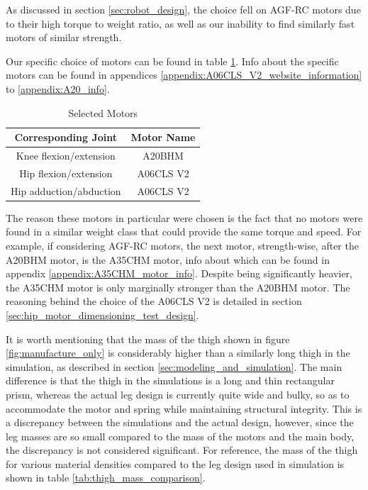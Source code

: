 As discussed in section \ref{sec:robot_design}, the choice fell on AGF-RC motors due to their high torque to weight ratio, as well as our inability to find similarly fast motors of similar strength. 

Our specific choice of motors can be found in table \ref{tab:motor_selection}. Info about the specific motors can be found in appendices \ref{appendix:A06CLS_V2_website_information} to \ref{appendix:A20_info}.

\begin{table}[h!]
    \centering
    \begin{tabular}{|c|c|}
        \hline
        Corresponding Joint & Motor Name\\ \hline
        Knee flexion/extension & A20BHM \\
        Hip flexion/extension & A06CLS V2 \\
        Hip adduction/abduction & A06CLS V2 \\ \hline
    \end{tabular}
    \caption{Selected Motors}
    \label{tab:motor_selection}
\end{table}

The reason these motors in particular were chosen is the fact that no motors were found in a similar weight class that could provide the same torque and speed. For example, if considering AGF-RC motors, the next motor, strength-wise, after the A20BHM motor, is the A35CHM motor, info about which can be found in appendix \ref{appendix:A35CHM_motor_info}. Despite being significantly heavier, the A35CHM motor is only marginally stronger than the A20BHM motor. The reasoning behind the choice of the A06CLS V2 is detailed in section \ref{sec:hip_motor_dimensioning_test_design}.

It is worth mentioning that the mass of the thigh shown in figure \ref{fig:manufacture_only} is considerably higher than a similarly long thigh in the simulation, as described in section \ref{sec:modeling_and_simulation}. The main difference is that the thigh in the simulations is a long and thin rectangular prism, whereas the actual leg design is currently quite wide and bulky, so as to accommodate the motor and spring while maintaining structural integrity. This is a discrepancy between the simulations and the actual design, however, since the leg masses are so small compared to the mass of the motors and the main body, the discrepancy is not considered significant. For reference, the mass of the thigh for various material densities compared to the leg design used in simulation is shown in table \ref{tab:thigh_mass_comparison}.

